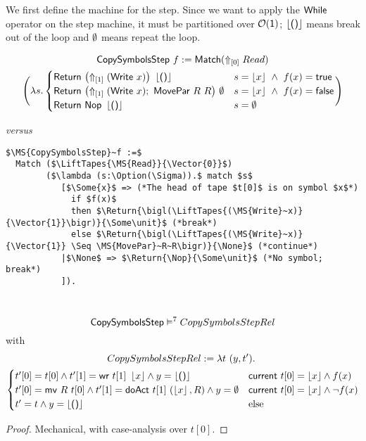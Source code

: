 We first define the machine for the step.  Since we want to apply the $\While$ operator on the step machine, it must be partitioned over
$\Option(\Unit)$; $\Some\unit$ means break out of the loop and $\None$ means repeat the loop.
\begin{definition}[$\MS{CopySymbolsStep}$]
  \label{CopySymbols_Step}
  \begin{multline*}
    \MS{CopySymbolsStep}~f :=
    \Match(\LiftTapes{Read}{\Vector{0}}) \\
    \Biggl(
    \lambda s.
    \begin{cases}
      \Return{\bigl(\LiftTapes{(\MS{Write}~x)}{\Vector{1}}\bigr)}{\Some\unit} & s=\Some{x} ~\land~ f(x)=\true \\
      \Return{\bigl(\LiftTapes{(\MS{Write}~x)}{\Vector{1}} \Seq \MS{MovePar}~R~R\bigr)}{\None} & s=\Some{x} ~\land~ f(x)=\false \\
      \Return{\Nop}{\Some\unit} & s=\None
    \end{cases}
    \Biggr)
  \end{multline*}
  \centerline{\emph{versus}}
  \small
\begin{lstlisting}[style=semicoqstyle]
$\MS{CopySymbolsStep}~f :=$
  Match ($\LiftTapes{\MS{Read}}{\Vector{0}}$)
        ($\lambda (s:\Option(\Sigma)).$ match $s$
           [$\Some{x}$ => (*The head of tape $t[0]$ is on symbol $x$*)
             if $f(x)$
             then $\Return{\bigl(\LiftTapes{(\MS{Write}~x)}{\Vector{1}}\bigr)}{\Some\unit}$ (*break*)
             else $\Return{\bigl(\LiftTapes{(\MS{Write}~x)}{\Vector{1}} \Seq \MS{MovePar}~R~R\bigr)}{\None}$ (*continue*)
           |$\None$ => $\Return{\Nop}{\Some\unit}$ (*No symbol; break*)
           ]).
\end{lstlisting}
\end{definition}

\begin{lemma}
  \label{lem:CopySymbols_Step_Sem}
  ~
  \[
    \MS{CopySymbolsStep} \vDash^7 CopySymbolsStepRel
  \]
  with
  \begin{multline*}
    CopySymbolsStepRel := \lambda t~(y, t').~\\
    \begin{cases}
      t'[0] = t[0]           \land t'[1]=\MS{wr}~t[1]~\Some{x}         \land y=\Some\unit & \MS{current}~t[0]=\Some{x} \land       f(x) \\
      t'[0] = \MS{mv}~R~t[0] \land t'[1]=\MS{doAct}~t[1]~(\Some{x}, R) \land y=\None      & \MS{current}~t[0]=\Some{x} \land \lnot f(x) \\
      t' = t \land y=\Some\unit                                                           & \text{else}
    \end{cases}
  \end{multline*}
\end{lemma}
\begin{proof}
  Mechanical, with case-analysis over $t[0]$.
\end{proof}

